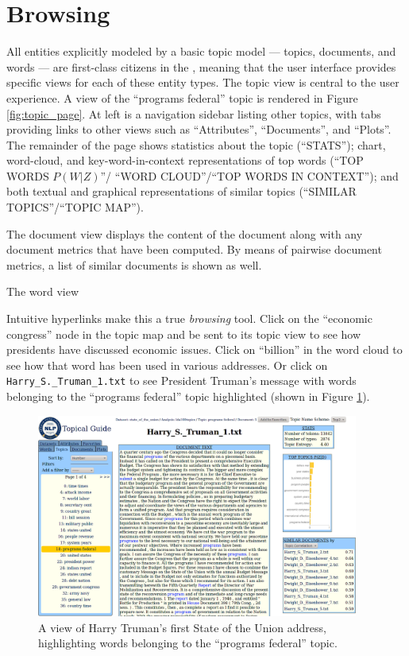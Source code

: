 \documentclass[11pt]{article}
\begin{document}
\section{Browsing}%
All entities explicitly modeled by a basic topic model --- topics, documents,
and words --- are first-class citizens in the \tool, meaning that the user
interface provides specific views for each of these entity types. The topic view
is central to the user experience. A view of the ``programs federal'' topic is
rendered in Figure \ref{fig:topic_page}. At left is a navigation sidebar listing other topics,
with tabs providing links to other views such as ``Attributes'', ``Documents'', and ``Plots''.
The remainder of the page shows statistics about the topic
(``STATS''); chart, word-cloud, and key-word-in-context representations of top
words (``TOP WORDS $P(W|Z)$''/ ``WORD CLOUD''/``TOP WORDS IN CONTEXT''); and
both textual and graphical representations of similar topics (``SIMILAR
TOPICS''/``TOPIC MAP'').

The document view displays the content of the document along with any document
metrics that have been computed. By means of pairwise document metrics,
a list of similar documents is shown as well.

The word view

Intuitive hyperlinks make this a true \textit{browsing} tool. Click on the
``economic congress'' node in the topic map and be sent to its topic view to see
how presidents have discussed economic issues. Click on ``billion'' in the word
cloud to see how that word has been used in various addresses. Or click on \texttt{Harry\_S.\_Truman\_1.txt}
to see President Truman's message with words belonging to the ``programs federal''
topic highlighted (shown in Figure \ref{fig:topic_doc}).

\begin{figure}[t]
 \centering
 \includegraphics[width=400px,keepaspectratio=true]{./topic_document_view.png}
 \caption{A view of Harry Truman's first State of the Union address, highlighting words belonging to the ``programs federal'' topic.}
 \label{fig:topic_doc}
\end{figure}
\end{document}
